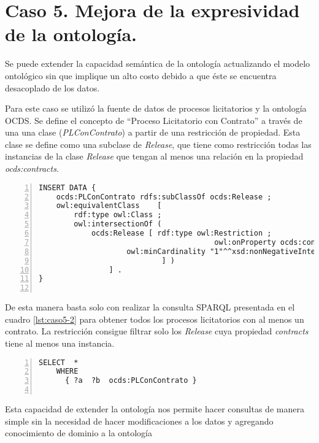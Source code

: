 \section{Caso 5. Mejora de la expresividad de la ontología. }

Se puede extender la capacidad semántica de la ontología actualizando el modelo ontológico sin que implique un alto costo debido a que éste se encuentra desacoplado de los datos.

Para este caso se utilizó la fuente de datos de procesos licitatorios y la ontología OCDS. Se define el concepto de “Proceso Licitatorio con Contrato” a través de una una clase (\textit{PLConContrato}) a partir de una restricción de propiedad. Esta clase se define como una subclase de \textit{Release}, que tiene como restricción todas las instancias de la clase \textit{Release} que tengan al menos una relación en la propiedad \textit{ocds:contracts}.\hfill \break


\noindent\begin{minipage}[c]{\textwidth}
\begin{lstlisting}[captionpos=b, caption=Extension de la ontologia utilizando restricciones ontologicas, label={lst:caso5-1},  numbers=left,  numberstyle=\tiny\color{mygray},
    basicstyle=\footnotesize\ttfamily,frame=single]
INSERT DATA {
    ocds:PLConContrato rdfs:subClassOf ocds:Release ; 
    owl:equivalentClass    [ 
        rdf:type owl:Class ;
        owl:intersectionOf (   
            ocds:Release [ rdf:type owl:Restriction ;
                                        owl:onProperty ocds:contracts; 
                    owl:minCardinality "1"^^xsd:nonNegativeInteger ;
                            ] )
                ] .
}
    
 \end{lstlisting}
\end{minipage}
 De esta manera basta solo con realizar la consulta SPARQL presentada en el cuadro \ref{lst:caso5-2} para obtener todos los procesos licitatorios con al menos un contrato. La restricción consigue filtrar solo los \textit{Release} cuya propiedad \textit{contracts} tiene al menos una instancia.\hfill \break

\noindent\begin{minipage}[c]{\textwidth}
 \begin{lstlisting}[captionpos=b, caption=Consulta SPARQL utilizando la Clase PLConContrato, label=lst:caso5-2,  numbers=left,  numberstyle=\tiny\color{mygray},
    basicstyle=\footnotesize\ttfamily,frame=single]
SELECT  *
    WHERE
      { ?a  ?b  ocds:PLConContrato }
    
 \end{lstlisting}
\end{minipage}
 Esta capacidad de extender la ontología nos permite hacer consultas de manera simple sin la necesidad de hacer modificaciones a los datos y agregando conocimiento de dominio a la ontología